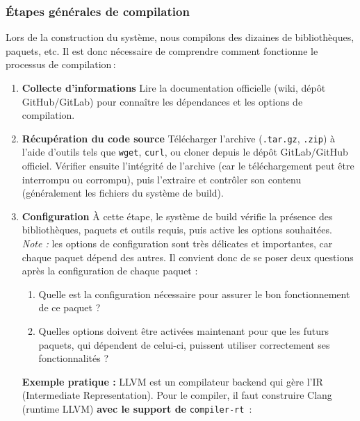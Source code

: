 \subsubsection{Étapes générales de compilation}
\label{sssec:etapes-compilation}

Lors de la construction du système, nous compilons des dizaines de bibliothèques, paquets, etc. Il est donc nécessaire de comprendre comment fonctionne le processus de compilation :

\begin{enumerate}
  \item \textbf{Collecte d’informations}  
    Lire la documentation officielle (wiki, dépôt GitHub/GitLab) pour connaître les dépendances et les options de compilation.\\
    

  \item \textbf{Récupération du code source}  
    Télécharger l’archive (\texttt{.tar.gz}, \texttt{.zip}) à l’aide d’outils tels que \texttt{wget}, \texttt{curl}, ou cloner depuis le dépôt GitLab/GitHub officiel.  
    Vérifier ensuite l’intégrité de l’archive (car le téléchargement peut être interrompu ou corrompu), puis l’extraire et contrôler son contenu (généralement les fichiers du système de build).\\

 \item \textbf{Configuration}  
    À cette étape, le système de build vérifie la présence des bibliothèques, paquets et outils requis, puis active les options souhaitées.  \\
    \textit{Note :} les options de configuration sont très délicates et importantes, car chaque paquet dépend des autres. Il convient donc de se poser deux questions après la configuration de chaque paquet :
    \begin{enumerate}[label=\arabic*)]
      \item Quelle est la configuration nécessaire pour assurer le bon fonctionnement de ce paquet ?
      \item Quelles options doivent être activées maintenant pour que les futurs paquets, qui dépendent de celui-ci, puissent utiliser correctement ses fonctionnalités ?
    \end{enumerate}


    \medskip
    \noindent\textbf{Exemple pratique :}  
    LLVM est un compilateur backend qui gère l’IR (Intermediate Representation). Pour le compiler, il faut construire Clang (runtime LLVM) \textbf{avec le support de}  \texttt{compiler-rt} :


\end{enumerate}
